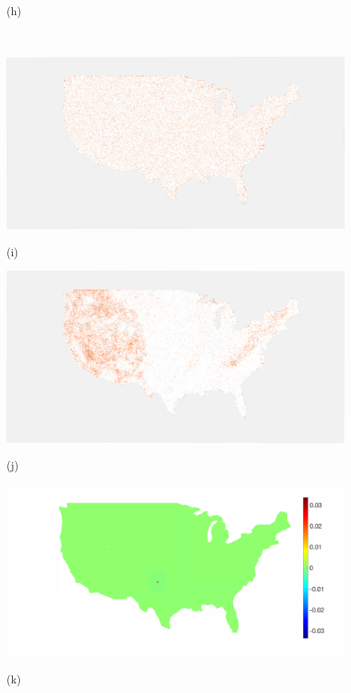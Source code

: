 \documentclass[journal, 10pt]{IEEEtran}
\begin{document}
\begin{figure}[tb]
\begin{minipage}[m]{0.24\linewidth}
\centerline{\small{(h)}}
\end{minipage} \medskip  \\
\begin{minipage}[m]{0.24\linewidth}
\centerline{\includegraphics[width=.84\linewidth]{fig_temp_selected_b2}}
\centerline{\small{(i)}}
\end{minipage}%
\begin{minipage}[m]{0.24\linewidth}
\centerline{\includegraphics[width=.84\linewidth]{fig_temp_selected_b2_adapted}}
\centerline{\small{(j)}}
\end{minipage}
\begin{minipage}[m]{0.24\linewidth}
\centerline{\includegraphics[width=.9\linewidth]{fig_temp_scaling}}
\centerline{\small{(k)}} 
\end{minipage} 

\end{figure}
\end{document}
